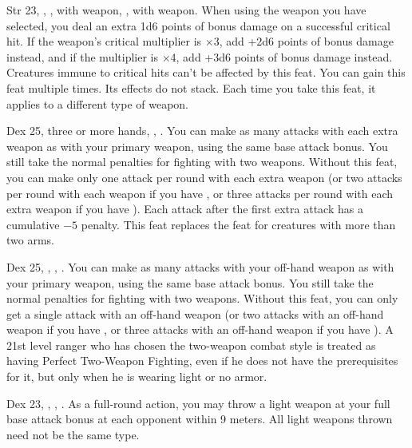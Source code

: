 {}
{Str 23, , ,  with weapon, ,  with weapon.}
{When using the weapon you have selected, you deal an extra 1d6 points of bonus damage on a successful critical hit. If the weapon's critical multiplier is $\times$3, add +2d6 points of bonus damage instead, and if the multiplier is $\times$4, add +3d6 points of bonus damage instead. Creatures immune to critical hits can't be affected by this feat.}
{}{You can gain this feat multiple times. Its effects do not stack. Each time you take this feat, it applies to a different type of weapon.}


{}
{Dex 25, three or more hands, , .}
{You can make as many attacks with each extra weapon as with your primary weapon, using the same base attack bonus. You still take the normal penalties for fighting with two weapons.}
{Without this feat, you can make only one attack per round with each extra weapon (or two attacks per round with each weapon if you have , or three attacks per round with each extra weapon if you have ). Each attack after the first extra attack has a cumulative $-5$ penalty.}
{This feat replaces the  feat for creatures with more than two arms.}

{}
{Dex 25, , , .}
{You can make as many attacks with your off-hand weapon as with your primary weapon, using the same base attack bonus. You still take the normal penalties for fighting with two weapons.}
{Without this feat, you can only get a single attack with an off-hand weapon (or two attacks with an off-hand weapon if you have , or three attacks with an off-hand weapon if you have ).}
{A 21st level ranger who has chosen the two-weapon combat style is treated as having Perfect Two-Weapon Fighting, even if he does not have the prerequisites for it, but only when he is wearing light or no armor.}

{Dex 23, , , .}
{As a full-round action, you may throw a light weapon at your full base attack bonus at each opponent within 9 meters. All light weapons thrown need not be the same type.}

